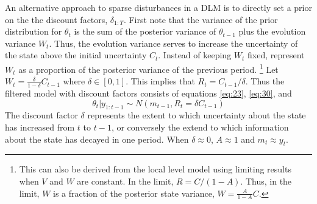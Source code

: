 \documentclass{article}
\begin{document}
An alternative approach to sparse disturbances in a DLM is to directly set a prior on the the discount factors, $\delta_{1:T}$. 
First note that the variance of the prior distribution for $\theta_{t}$  is the sum of the posterior variance of $\theta_{t - 1}$ plus the evolution variance $W_{t}$.
Thus, the evolution variance serves to increase the uncertainty of the state above the initial uncertainty $C_{t}$.
Instead of keeping $W_{t}$ fixed, represent $W_{t}$ as a proportion of the posterior variance of the previous period.%
\footnote{
  This can also be derived from the local level model using limiting results when $V$ and $W$ are constant. 
  In the limit, $R = C / (1 - A)$.
  Thus, in the limit, $W$ is a fraction of the posterior state variance, $W = \frac{A}{1 - A} C$.
}
Let $W_{t} = \frac{\delta}{1 - \delta} C_{t - 1}$ where $\delta \in [0, 1]$. 
This implies that $R_{t} = C_{t - 1} / \delta$.
Thus the filtered model with discount factors consists of equations \eqref{eq:23}, \eqref{eq:30}, and
\begin{equation}
  \label{eq:10}
  \theta_{t} | y_{1:t-1} \sim N(m_{t-1}, R_{t} = \delta C_{t - 1})
\end{equation}
The discount factor $\delta$ represents the extent to which uncertainty about the state has increased from $t$ to $t - 1$, or conversely the extend to which information about the state has decayed in one period.
When $\delta \approx 0$, $A \approx 1$ and $m_{t} \approx y_{t}$.
\end{document}

